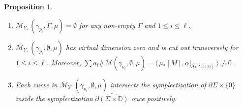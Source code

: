 \documentclass[11pt]{amsart}
\numberwithin{equation}{section}
\newtheorem{proposition}[theorem]{\textbf{Proposition}}
\def\D{{\mathbb D}}
\def\cM{{\mathcal M}}
\def\la{\langle\,}
\def\ra{\,\rangle}
\begin{document}
\begin{proposition}
\begin{enumerate}
\begin{enumerate}
            \item\label{4a} $\overline{\cM}_{Y_+}(\gamma_{p_i},\Gamma,\mu)=\emptyset$ for any non-empty $\Gamma$ and $1\le i \le \ell$.
            \item\label{4b} $\overline{\cM}_{Y_+}(\gamma_{p_i},\emptyset,\mu)$ has virtual dimension zero and is cut out transversely for $1\le i \le \ell$.  Moreover, $\sum a_i\# \overline{\cM}(\gamma_{p_i},\emptyset,\mu)=\la \mu_*[M], \alpha|_{\partial (\Sigma \times \D)}\ra\ne 0$.
            \item\label{4c} Each curve in $\overline{\cM}_{Y_+}(\gamma_{p_i},\emptyset,\mu)$ intersects the symplectization of $\partial \Sigma \times \{0\}$ inside the symplectization $\widehat{\partial (\Sigma \times \D)}$ once positively.
        \end{enumerate}
    \end{enumerate}
\end{proposition}
\end{document}
